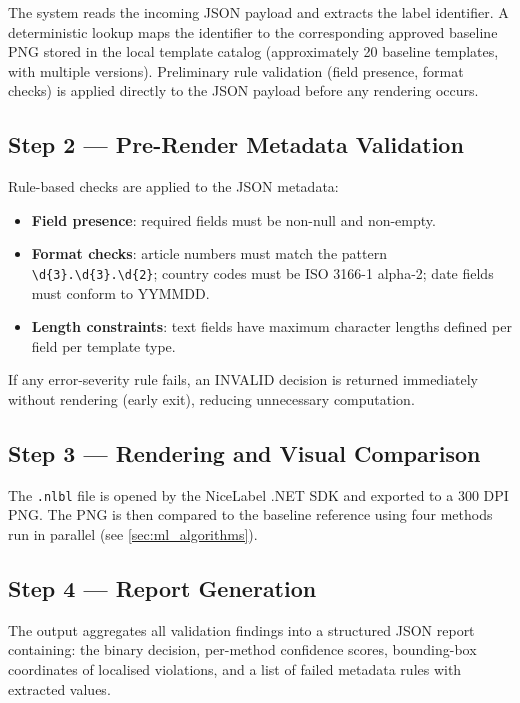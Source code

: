 The system reads the incoming JSON payload and extracts the label identifier. A
deterministic lookup maps the identifier to the corresponding approved baseline PNG
stored in the local template catalog (approximately 20 baseline templates, with multiple
versions). Preliminary rule validation (field presence, format checks) is applied
directly to the JSON payload before any rendering occurs.

\subsection{Step 2 — Pre-Render Metadata Validation}

Rule-based checks are applied to the JSON metadata:
\begin{itemize}
  \item \textbf{Field presence}: required fields must be non-null and non-empty.
  \item \textbf{Format checks}: article numbers must match the pattern
  \texttt{\textbackslash d\{3\}.\textbackslash d\{3\}.\textbackslash d\{2\}};
  country codes must be ISO 3166-1 alpha-2; date fields must conform to YYMMDD.
  \item \textbf{Length constraints}: text fields have maximum character lengths
  defined per field per template type.
\end{itemize}

If any error-severity rule fails, an INVALID decision is returned immediately without
rendering (early exit), reducing unnecessary computation.

\subsection{Step 3 — Rendering and Visual Comparison}

The \texttt{.nlbl} file is opened by the NiceLabel .NET SDK and exported to a
300 DPI PNG. The PNG is then compared to the baseline reference using four methods
run in parallel (see \cref{sec:ml_algorithms}).

\subsection{Step 4 — Report Generation}

The output aggregates all validation findings into a structured JSON report containing:
the binary decision, per-method confidence scores, bounding-box coordinates of
localised violations, and a list of failed metadata rules with extracted values.

